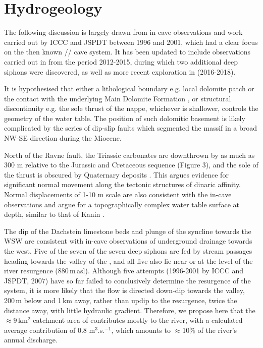 \section{Hydrogeology}
The following discussion is largely drawn from in-cave observations and work carried out by ICCC and JSPDT between 1996 and 2001, which had a clear focus on the then known // cave system. 
It has been updated to include observations carried out in  from the period 2012-2015, during which two additional deep siphons were discovered, as well as more recent exploration in  (2016-2018).

It is hypothesised that either a lithological boundary e.g. local dolomite patch or the contact with the underlying Main Dolomite Formation \citep{ogorelec1996dachstein}, or structural discontinuity e.g. the sole thrust of the  nappe, whichever is shallower, controls the geometry of the water table. 
The position of such dolomitic basement is likely complicated by the series of dip-slip faults which segmented the massif in a broad NW-SE direction during the Miocene.

North of the Ravne fault, the Triassic carbonates are downthrown by as much as 300 m relative to the Jurassic and Cretaceous sequence (Figure 3), and the sole of the thrust is obscured by Quaternary deposits \citep{buser1986tolmavc,hm1}. 
This argues evidence for significant normal movement along the tectonic structures of dinaric affinity. 
Normal displacements of 1-10 m scale are also consistent with the in-cave observations and argue for a topographically complex water table surface at depth, similar to that of Kanin \citep{kunaver1983geomorf,audra2000karst}.

The dip of the Dachstein limestone beds and plunge of the syncline towards the WSW are consistent with in-cave observations of underground drainage towards the west. 
Five of the seven of the seven deep siphons are fed by stream passages heading towards the valley of the , and all five also lie near or at the level of the  river resurgence (880\,m\,asl). 
Although five attempts (1996-2001 by ICCC and JSPDT, 2007) have so far failed to conclusively determine the resurgence of the  system, it is more likely that the flow is directed down-dip towards the  valley, 200\,m below and 1\,km away, rather than updip to the  resurgence,  twice the distance away, with little hydraulic gradient. 
Therefore, we propose here that the $\approx$9\,km$^2$ catchment area of  contributes mostly to the  river,  with a calculated  average contribution of 0.8 m$^3$.s.$^{-1}$, which amounts to $\approx$10\% of the river’s annual discharge. 

